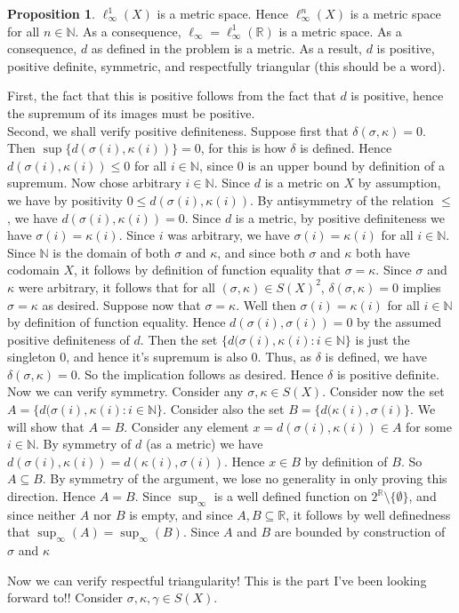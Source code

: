 \documentclass[11pt]{article}
\newcommand{\R}{\mathbb{R}}
\newcommand{\N}{\mathbb{N}}
\theoremstyle{definition}
\newtheorem{proposition}{Proposition}
\begin{document}
\begin{proposition}
$\ell^1_\infty(X)$ is a metric space. Hence $\ell^n_\infty(X)$ is a metric space for all $n\in \N$. As a consequence, $\ell_\infty = \ell^1_\infty(\R)$ is a metric space. As a consequence, $d$ as defined in the problem is a metric. As a result, $d$ is positive, positive definite, symmetric, and respectfully triangular (this should be a word).
\end{proposition}

First, the fact that this is positive follows from the fact that $d$ is positive, hence the supremum of its images must be positive. \\

Second, we shall verify positive definiteness. Suppose first that $\delta(\sigma, \kappa) = 0$. Then $\sup\{d(\sigma(i),\kappa(i))\} = 0$, for this is how $\delta$ is defined. Hence $d(\sigma(i), \kappa(i)) \le 0$ for all $i\in \N$, since $0$ is an upper bound by definition of a supremum. Now chose arbitrary $i\in \N$. Since $d$ is a metric on $X$ by assumption, we have by positivity $0\le d(\sigma(i), \kappa(i))$. By antisymmetry of the relation $\le$, we have $d(\sigma(i),\kappa(i)) = 0$. Since $d$ is a metric, by positive definiteness we have $\sigma(i) = \kappa(i)$. Since $i$ was arbitrary, we have $\sigma(i) = \kappa (i)$ for all $i\in \N$. Since $\N$ is the domain of both $\sigma$ and $\kappa$, and since both $\sigma$ and $\kappa$ both have codomain $X$, it follows by definition of function equality that $\sigma = \kappa$. Since $\sigma$ and $\kappa$ were arbitrary, it follows that for all $(\sigma,\kappa)\in S(X)^2$, $\delta(\sigma,\kappa) = 0$ implies $\sigma = \kappa$ as desired. Suppose now that $\sigma = \kappa$. Well then $\sigma(i) = \kappa(i)$ for all $i\in \N$ by definition of function equality. Hence $d(\sigma(i),\sigma(i)) = 0$ by the assumed positive definiteness of $d$. Then the set $\{d(\sigma(i), \kappa(i):i\in \N\}$ is just the singleton $0$, and hence it's supremum is also $0$. Thus, as $\delta$ is defined, we have $\delta(\sigma,\kappa) = 0$. So the implication follows as desired. Hence $\delta$ is positive definite.\\

Now we can verify symmetry. Consider any $\sigma,\kappa\in S(X)$. Consider now the set $A = \{d(\sigma(i), \kappa(i):i\in \N\}$. Consider also the set $B = \{d(\kappa(i), \sigma(i)\}$. We will show that $A = B$. Consider any element $x = d(\sigma(i), \kappa(i))\in A$ for some $i\in \N$. By symmetry of $d$ (as a metric) we have $d(\sigma(i), \kappa(i)) =d(\kappa(i), \sigma(i))$. Hence $x\in B$ by definition of $B$. So $A\subseteq B$. By symmetry of the argument, we lose no generality in only proving this direction. Hence $A = B$. Since $\sup_\infty$ is a well defined function on $2^\R\setminus\{\emptyset\}$, and since neither $A$ nor $B$ is empty, and since $A,B\subseteq \R$, it follows by well definedness that $\sup_\infty(A) = \sup_\infty(B)$. Since $A$ and $B$ are bounded by construction of $\sigma$ and $\kappa$

Now we can verify respectful triangularity! This is the part I've been looking forward to!! Consider $\sigma,\kappa, \gamma\in S(X)$. 
\end{document}
